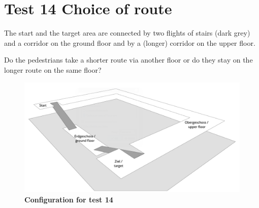 \section*{Test 14 Choice of route}

The start and the target area are connected by two flights of stairs (dark grey) and a corridor on the ground floor and by a (longer) corridor on the upper floor.

\noindent
Do the pedestrians take a shorter route via another floor or do they stay on the longer route on the same floor?


\begin{figure}[h]
	\centering
	\includegraphics[scale=0.44]{test_description/geo_test_14.png}
	\caption{\footnotesize \textbf{Configuration for test 14}}
\end{figure}

